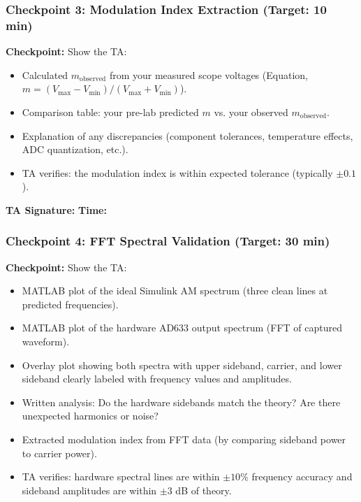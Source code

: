 \documentclass[11pt,letterpaper]{article}
\providecommand{\cpECE}[1]{\textcolor{OliveGreen}{\textbf{Checkpoint:} #1}}
\begin{document}
\vspace{0.5cm}

\subsubsection*{Checkpoint 3: Modulation Index Extraction (Target: 10 min)}

\cpECE{Show the TA:}
\begin{itemize}
    \item[$\square$] Calculated $m_{\text{observed}}$ from your measured scope voltages (Equation, $m = (V_{\max} - V_{\min}) / (V_{\max} + V_{\min})$).
    \item[$\square$] Comparison table: your pre-lab predicted $m$ vs. your observed $m_{\text{observed}}$.
    \item[$\square$] Explanation of any discrepancies (component tolerances, temperature effects, ADC quantization, etc.).
    \item[$\square$] TA verifies: the modulation index is within expected tolerance (typically $\pm 0.1$).
\end{itemize}

\vspace{0.3cm}
\textbf{TA Signature:} \underline{\hspace{2.5cm}} \quad \textbf{Time:} \underline{\hspace{1.5cm}}

\vspace{0.5cm}

\subsubsection*{Checkpoint 4: FFT Spectral Validation (Target: 30 min)}

\cpECE{Show the TA:}
\begin{itemize}
    \item[$\square$] MATLAB plot of the ideal Simulink AM spectrum (three clean lines at predicted frequencies).
    \item[$\square$] MATLAB plot of the hardware AD633 output spectrum (FFT of captured waveform).
    \item[$\square$] Overlay plot showing both spectra with upper sideband, carrier, and lower sideband clearly labeled with frequency values and amplitudes.
    \item[$\square$] Written analysis: Do the hardware sidebands match the theory? Are there unexpected harmonics or noise?
    \item[$\square$] Extracted modulation index from FFT data (by comparing sideband power to carrier power).
    \item[$\square$] TA verifies: hardware spectral lines are within $\pm 10\%$ frequency accuracy and sideband amplitudes are within $\pm 3$ dB of theory.
\end{itemize}
\end{document}
